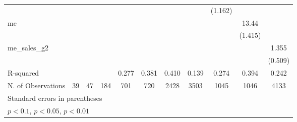 {\begin{tabular}{l*{10}{c}}
            &                     &                     &                     &                     &                     &                     &                     &     (1.162)         &                     &                     \\
[1em]
me          &                     &                     &                     &                     &                     &                     &                     &                     &       13.44\sym{***}&                     \\
            &                     &                     &                     &                     &                     &                     &                     &                     &     (1.415)         &                     \\
[1em]
me\_sales\_g2 &                     &                     &                     &                     &                     &                     &                     &                     &                     &       1.355\sym{**} \\
            &                     &                     &                     &                     &                     &                     &                     &                     &                     &     (0.509)         \\
\hline
R-squared   &                     &                     &                     &       0.277         &       0.381         &       0.410         &       0.139         &       0.274         &       0.394         &       0.242         \\
N. of Observations &          39         &          47         &         184         &         701         &         720         &        2428         &        3503         &        1045         &        1046         &        4133         \\
\hline\hline
\multicolumn{11}{l}{\footnotesize Standard errors in parentheses}\\
\multicolumn{11}{l}{\footnotesize \sym{*} \(p<0.1\), \sym{**} \(p<0.05\), \sym{***} \(p<0.01\)}\\
\end{tabular}
}
